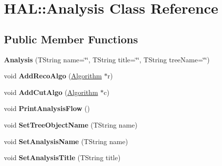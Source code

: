 \hypertarget{class_h_a_l_1_1_analysis}{\section{H\-A\-L\-:\-:Analysis Class Reference}
\label{class_h_a_l_1_1_analysis}
}
\subsection*{Public Member Functions}
\begin{DoxyCompactItemize}
\item 
\hypertarget{class_h_a_l_1_1_analysis_ab95bfff098f6a9543d444078cef3be91}{{\bfseries Analysis} (T\-String name=\char`\"{}\char`\"{}, T\-String title=\char`\"{}\char`\"{}, T\-String tree\-Name=\char`\"{}\char`\"{})}\label{class_h_a_l_1_1_analysis_ab95bfff098f6a9543d444078cef3be91}

\item 
\hypertarget{class_h_a_l_1_1_analysis_ac7e8314701f2b10f684d3b795031299e}{void {\bfseries Add\-Reco\-Algo} (\hyperlink{class_h_a_l_1_1_algorithm}{Algorithm} $\ast$r)}\label{class_h_a_l_1_1_analysis_ac7e8314701f2b10f684d3b795031299e}

\item 
\hypertarget{class_h_a_l_1_1_analysis_a4cdeca8d55dbfcc19261baedca02e424}{void {\bfseries Add\-Cut\-Algo} (\hyperlink{class_h_a_l_1_1_algorithm}{Algorithm} $\ast$c)}\label{class_h_a_l_1_1_analysis_a4cdeca8d55dbfcc19261baedca02e424}

\item 
\hypertarget{class_h_a_l_1_1_analysis_af755ad7b542eb634144c99b1d142519c}{void {\bfseries Print\-Analysis\-Flow} ()}\label{class_h_a_l_1_1_analysis_af755ad7b542eb634144c99b1d142519c}

\item 
\hypertarget{class_h_a_l_1_1_analysis_a56e97ef132e10b2a5f96c71c5145127b}{void {\bfseries Set\-Tree\-Object\-Name} (T\-String name)}\label{class_h_a_l_1_1_analysis_a56e97ef132e10b2a5f96c71c5145127b}

\item 
\hypertarget{class_h_a_l_1_1_analysis_abcbdb0f6cad2060cf3f6bca7d0eb9ada}{void {\bfseries Set\-Analysis\-Name} (T\-String name)}\label{class_h_a_l_1_1_analysis_abcbdb0f6cad2060cf3f6bca7d0eb9ada}

\item 
\hypertarget{class_h_a_l_1_1_analysis_ab4ecf4f7c5c29027ac3eb3e3a2e3a780}{void {\bfseries Set\-Analysis\-Title} (T\-String title)}\label{class_h_a_l_1_1_analysis_ab4ecf4f7c5c29027ac3eb3e3a2e3a780}


\end{DoxyCompactItemize}
